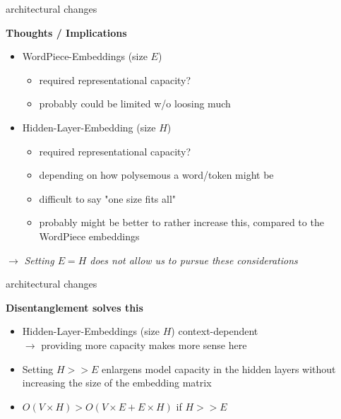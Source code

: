 
\begin{frame}{architectural changes}

\vfill

\textbf{Thoughts / Implications}

	\begin{itemize}
		\item	WordPiece-Embeddings (size $E$) 
			\begin{itemize}
				\item required representational capacity?
				\item probably could be limited w/o loosing much
			\end{itemize}
		\item Hidden-Layer-Embedding (size $H$)
			\begin{itemize}
				\item required representational capacity?
				\item depending on how polysemous a word/token might be
				\item difficult to say "one size fits all"
				\item probably might be better to rather increase this, compared to the WordPiece embeddings
			\end{itemize}
	\end{itemize}
	
\vspace{.5cm}

$\to$ \textit{Setting $E = H$ does not allow us to pursue these considerations}

\vfill

\end{frame}


\begin{frame}{architectural changes}

\vfill

\textbf{Disentanglement solves this}

	\begin{itemize}
		\item Hidden-Layer-Embeddings (size $H$) context-dependent\\
					$\to$ providing more capacity makes more sense here
		\item Setting $H >> E$ enlargens model capacity in the hidden layers without increasing the size of the embedding matrix
		\item $O(V \times H) > O(V \times E +  E \times H)$ if $H >> E$
\end{itemize}

\vfill

\end{frame}

